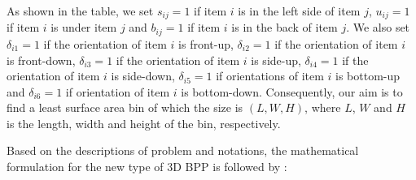 As shown in the table, we set $s_{ij} = 1$ if item $i$ is in the left side of item $j$, $u_{ij} = 1$ if item $i$ is under item $j$ and $b_{ij} = 1$ if item $i$ is in the back of item $j$.
We also set ${\delta}_{i1} = 1$ if the orientation of item $i$ is front-up, ${\delta}_{i2} = 1$ if the orientation of item $i$ is front-down, ${\delta}_{i3}=1$ if the orientation of item $i$ is side-up, ${\delta}_{i4}=1$ if the orientation of item $i$ is side-down, ${\delta}_{i5} = 1$ if orientations of item $i$ is bottom-up and ${\delta}_{i6} = 1$ if orientation of item $i$ is bottom-down. Consequently, our aim is to find a least surface area bin of which the size is $(L,W,H)$, where $L$, $W$ and $H$ is the length, width and height of the bin, respectively. 

Based on the descriptions of problem and notations, the mathematical formulation for the new type of 3D BPP is followed by \cite{hifi2010linear}:
